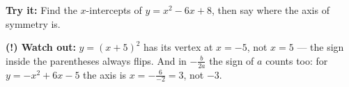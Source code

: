 \documentclass[12pt]{article}
\begin{document}
\begin{tryitbox}
\textbf{Try it:} Find the $x$-intercepts of $y = x^2 - 6x + 8$, then say where
the axis of symmetry is.\\[2pt]
\end{tryitbox}

\begin{watchoutbox}
\textbf{(!) Watch out:} $y = (x+5)^2$ has its vertex at $x = -5$, not $x = 5$
--- the sign inside the parentheses always flips. And in $-\frac{b}{2a}$ the
sign of $a$ counts too: for $y = -x^2 + 6x - 5$ the axis is
$x = -\frac{6}{-2} = 3$, not $-3$.
\end{watchoutbox}
\end{document}
